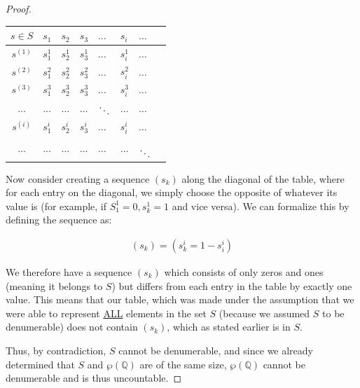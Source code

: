 \documentclass{article}
\begin{document}
\begin{proof}
	\begin{tabularx}{\linewidth}{ c || Y  Y  Y  Y  Y  Y  Y |}
		$s \in S$ & $s_1$ & $s_2$ & $s_3$ & $\ldots$ & $s_i$ & $\ldots$ \\
		\hline
		$s^{(1)}$ & $s_1^1$ & $s_2^1$ & $s_3^1$ & $\ldots$ & $s_i^1$ & $\ldots$ \\
		$s^{(2)}$ & $s_1^2$ & $s_2^2$ & $s_3^2$ & $\ldots$ & $s_i^2$ & $\ldots$ \\
		$s^{(3)}$ & $s_1^3$ & $s_2^3$ & $s_3^3$ & $\ldots$ & $s_i^3$ & $\ldots$ \\
		$\ldots$ & $\ldots$ & $\ldots$ & $\ldots$ & $\raisebox{-1ex}{$\ddots$}$ & $\ldots$ & $\ldots$ \\
		$s^{(i)}$ & $s_1^i$ & $s_2^i$ & $s_3^i$ & $\ldots$ & $s_i^i$ & $\ldots$ \\
		$\ldots$ & $\ldots$ & $\ldots$ & $\ldots$ & $\ldots$ & $\ldots$ & $\raisebox{-2.5ex}{$\ddots$}$
	\end{tabularx}

	\vspace{1cm}

	Now consider creating a sequence $(s_k)$ along the diagonal of the table, where for each entry on the diagonal, we simply choose the opposite of whatever its value is (for example, if $S_1^1 = 0, s_k^1 = 1$ and vice versa). We can formalize this by defining the sequence as:

	\begin{align*}
		(s_k) = (s_k^i = 1 - s_i^i)
	\end{align*}

	We therefore have a sequence $(s_k)$ which consists of only zeros and ones (meaning it belongs to $S$) but differs from each entry in the table by exactly one value. This means that our table, which was made under the assumption that we were able to represent \underline{ALL} elements in the set $S$ (because we assumed $S$ to be denumerable) does not contain $(s_k)$, which as stated earlier is in $S$.

	Thus, by contradiction, $S$ cannot be denumerable, and since we already determined that $S$ and $\wp(\mathbb{Q})$ are of the same size, $\wp(\mathbb{Q})$ cannot be denumerable and is thus uncountable.
\end{proof}

\vspace{1cm}
\end{document}
